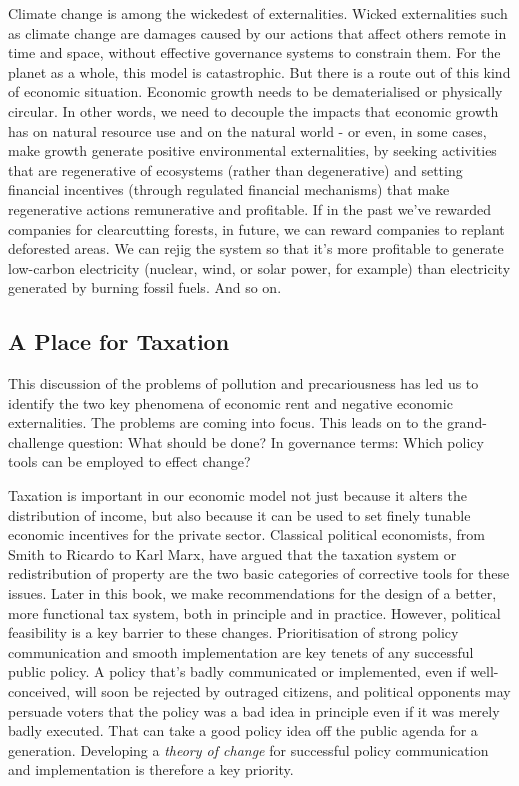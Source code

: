 \documentclass[]{tufte-handout}
\begin{document}
Climate change is among the wickedest of externalities. Wicked
externalities such as climate change are damages caused by our actions
that affect others remote in time and space, without effective
governance systems to constrain them. For the planet as a whole, this
model is catastrophic. But there is a route out of this kind of economic
situation. Economic growth needs to be dematerialised or physically
circular. In other words, we need to decouple the impacts that economic
growth has on natural resource use and on the natural world - or even,
in some cases, make growth generate positive environmental
externalities, by seeking activities that are regenerative of ecosystems
(rather than degenerative) and setting financial incentives (through
regulated financial mechanisms) that make regenerative actions
remunerative and profitable. If in the past we've rewarded companies for
clearcutting forests, in future, we can reward companies to replant
deforested areas. We can rejig the system so that it's more profitable
to generate low-carbon electricity (nuclear, wind, or solar power, for
example) than electricity generated by burning fossil fuels. And so on.

\hypertarget{a-place-for-taxation}{%
\subsection{A Place for Taxation}\label{a-place-for-taxation}}

This discussion of the problems of pollution and precariousness has led
us to identify the two key phenomena of economic rent and negative
economic externalities. The problems are coming into focus. This leads
on to the grand-challenge question: What should be done? In governance
terms: Which policy tools can be employed to effect change?

Taxation is important in our economic model not just because it alters
the distribution of income, but also because it can be used to set
finely tunable economic incentives for the private sector. Classical
political economists, from Smith to Ricardo to Karl Marx, have argued
that the taxation system or redistribution of property are the two basic
categories of corrective tools for these issues. Later in this book, we
make recommendations for the design of a better, more functional tax
system, both in principle and in practice. However, political
feasibility is a key barrier to these changes. Prioritisation of strong
policy communication and smooth implementation are key tenets of any
successful public policy. A policy that's badly communicated or
implemented, even if well-conceived, will soon be rejected by outraged
citizens, and political opponents may persuade voters that the policy
was a bad idea in principle even if it was merely badly executed. That
can take a good policy idea off the public agenda for a generation.
Developing a \emph{theory of change} for successful policy communication
and implementation is therefore a key priority.
\end{document}

